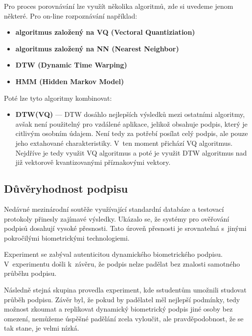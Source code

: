
Pro proces porovnávání lze využít několika algoritmů, zde si uvedeme jenom některé.
Pro on-line rozpoznávání například:
\begin{itemize}
  \item \textbf{algoritmus založený na VQ (Vectoral Quantiziation)}
  \item \textbf{algoritmus založený na NN (Nearest Neighbor)}
  \item \textbf{DTW (Dynamic Time Warping)}
  \item \textbf{HMM (Hidden Markov Model)}
\end{itemize}
Poté lze tyto algoritmy kombinovat:
\begin{itemize}
  \item \textbf{DTW(VQ)} --- DTW dosáhlo nejlepších výsledků mezi ostatními algoritmy, avšak není použitelný pro vzdálené aplikace, jelikož obsahuje podpis, který je citlivým osobním údajem.
  Není tedy za potřebí posílat celý podpis, ale pouze jeho extahované charakteristiky.
  V~ten moment přichází VQ algoritmus. Nejdříve je tedy využit VQ algoritmus a poté je využit DTW algoritmus nad již vektorově kvantizovanými příznakovými vektory.~\cite{Jain2006}
\end{itemize}

\subsection*{Důvěryhodnost podpisu}
Nedávné mezinárodní soutěže využívající standardní databáze a testovací protokoly přinesly zajímavé výsledky.   %
Ukázalo se, že systémy pro ověřování podpisů dosahují vysoké přesnosti.                                         %
Tato úroveň přesnosti je srovnatelná s~jinými pokročilými biometrickými technologiemi.~\cite{Impedovo2008}      %

Experiment se zabýval autenticitou dynamického biometrického podpisu.
V~experimentu došli k~závěru, že podpis nelze padělat bez znalosti samotného průběhu podpisu.~\cite{6986974} %

Následně stejná skupina provedla experiment, kde sstudentům umožnili studovat průběh podpisu.
Závěr byl, že pokud by padělatel měl nejlepší podmínky, tedy možnost zkoumat a replikovat dynamický biometrický podpis jiné osoby bez omezení, 
nemůžeme úspěšné padělání zcela vyloučit, ale pravděpodobnost, že se tak stane, je velmi nízká.~\cite{8585636} %

